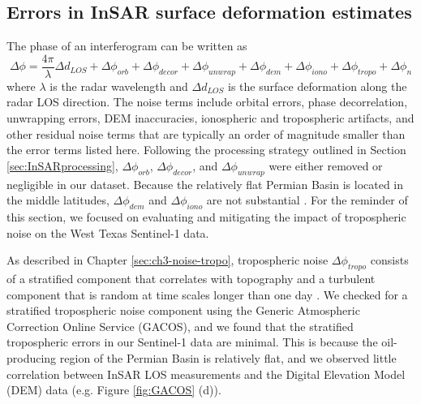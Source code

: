 \documentclass{utexasthesis}
\begin{document}
\subsection{Errors in InSAR surface deformation estimates}
\label{sec:errors} 
The phase of an interferogram can be written as \citep{Zebker1992DecorrelationInterferometricRadar, Zebker1994AccuracyTopographicMaps, Zebker1997AtmosphericEffectsInterferometric}
\begin{equation}
	\Delta \phi = \frac{4 \pi}{\lambda} \Delta d_{LOS} +  \Delta \phi_{orb} + \Delta \phi_{decor} + \Delta \phi_{unwrap}  + \Delta \phi_{dem} + \Delta \phi_{iono} + \Delta \phi_{tropo}  + \Delta \phi_{n}
\end{equation}
where $ \lambda $ is the radar wavelength and $ \Delta d_{LOS} $ is the surface deformation along the radar LOS direction. The noise terms include orbital errors, phase decorrelation, unwrapping errors, DEM inaccuracies, ionospheric and tropospheric artifacts, and other residual noise terms that are typically an order of magnitude smaller than the error terms listed here. Following the processing strategy outlined in Section \ref{sec:InSARprocessing}, $\Delta \phi_{orb}$, $\Delta \phi_{decor}$, and $\Delta \phi_{unwrap}$ were either removed or negligible in our dataset. Because the relatively flat Permian Basin is located in the middle latitudes, $\Delta \phi_{dem}$ and $\Delta \phi_{iono}$ are not substantial \citep{Fattahi2013DemErrorCorrection, Liang2019IonosphericCorrectionInsar}. For the reminder of this section, we focused on evaluating and mitigating the impact of tropospheric noise on the West Texas Sentinel-1 data.


%


As described in Chapter \ref{sec:ch3-noise-tropo}, tropospheric noise $\Delta \phi_{tropo}$ consists of a stratified component that correlates with topography \citep{Doin2009CorrectionsStratifiedTropospheric} and a turbulent component that is random at time scales longer than one day \citep{Emardson2003NeutralAtmosphericDelay}. We checked for a stratified tropospheric noise component using the Generic Atmospheric Correction Online Service (GACOS), and we found that the stratified tropospheric errors in our Sentinel-1 data are minimal. This is because the oil-producing region of the Permian Basin is relatively flat, and we observed little correlation between InSAR LOS measurements and the Digital Elevation Model (DEM) data (e.g. Figure \ref{fig:GACOS} (d)). 
\end{document}
